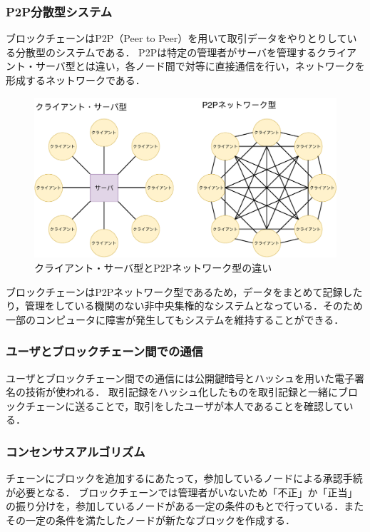 \documentclass[a4j,12pt]{jsarticle}
\begin{document}
\newpage
\subsubsection{P2P分散型システム}
ブロックチェーンはP2P（Peer to Peer）を用いて取引データをやりとりしている分散型のシステムである．
P2Pは特定の管理者がサーバを管理するクライアント・サーバ型とは違い，各ノード間で対等に直接通信を行い，ネットワークを形成するネットワークである．
\begin{figure}[H]
\centering
\includegraphics[width=13cm]{P2P.pdf}
\caption{クライアント・サーバ型とP2Pネットワーク型の違い}
\label{fig:no}
\end{figure} 



ブロックチェーンはP2Pネットワーク型であるため，データをまとめて記録したり，管理をしている機関のない非中央集権的なシステムとなっている．そのため一部のコンピュータに障害が発生してもシステムを維持することができる．

\subsubsection{ユーザとブロックチェーン間での通信}
ユーザとブロックチェーン間での通信には公開鍵暗号とハッシュを用いた電子署名の技術が使われる．
取引記録をハッシュ化したものを取引記録と一緒にブロックチェーンに送ることで，取引をしたユーザが本人であることを確認している．




\subsubsection{コンセンサスアルゴリズム}
チェーンにブロックを追加するにあたって，参加しているノードによる承認手続が必要となる．
ブロックチェーンでは管理者がいないため「不正」か「正当」の振り分けを，参加しているノードがある一定の条件のもとで行っている．またその一定の条件を満たしたノードが新たなブロックを作成する．
\end{document}
